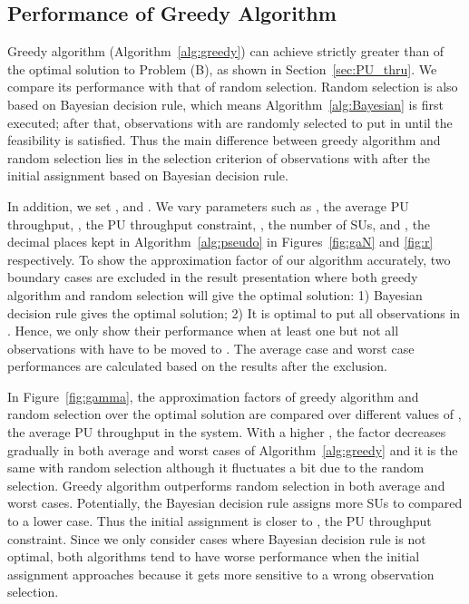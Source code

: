 \documentclass[conference]{IEEEtran}
\begin{document}
\subsection{Performance of Greedy Algorithm}
\label{subsec:B}

Greedy algorithm (Algorithm~\ref{alg:greedy}) can achieve strictly greater than  of the optimal solution to Problem (B), as shown in Section~\ref{sec:PU_thru}. We compare its performance with that of random selection. Random selection is also based on Bayesian decision rule, which means Algorithm~\ref{alg:Bayesian} is first executed; after that, observations with  are randomly selected to put in  until the feasibility is satisfied. Thus the main difference between greedy algorithm and random selection lies in the selection criterion of observations with  after the initial assignment based on Bayesian decision rule.  


In addition, we set ,  and . We vary parameters such as , the average PU throughput, , the PU throughput constraint, , the number of SUs, and , the decimal places kept in Algorithm~\ref{alg:pseudo} in Figures~\ref{fig:gaN} and \ref{fig:r} respectively. To show the approximation factor of our algorithm accurately, two boundary cases are excluded in the result presentation where both greedy algorithm and random selection will give the optimal solution: 1) Bayesian decision rule gives the optimal solution; 2) It is optimal to put all observations in . Hence, we only show their performance when at least one but not all observations with  have to be moved to . The average case and worst case performances are calculated based on the results after the exclusion.
 
In Figure~\ref{fig:gamma}, the approximation factors of greedy algorithm and random selection over the optimal solution are compared over different values of , the average PU throughput in the system. With a higher , the factor decreases gradually in both average and worst cases of Algorithm~\ref{alg:greedy} and it is the same with random selection although it fluctuates a bit due to the random selection. Greedy algorithm outperforms random selection in both average and worst cases. Potentially, the Bayesian decision rule assigns more SUs to  compared to a lower  case. Thus the initial assignment is closer to , the PU throughput constraint. Since we only consider cases where Bayesian decision rule is not optimal, both algorithms tend to have worse performance when the initial assignment approaches  because it gets more sensitive to a wrong observation selection. 
\end{document}
